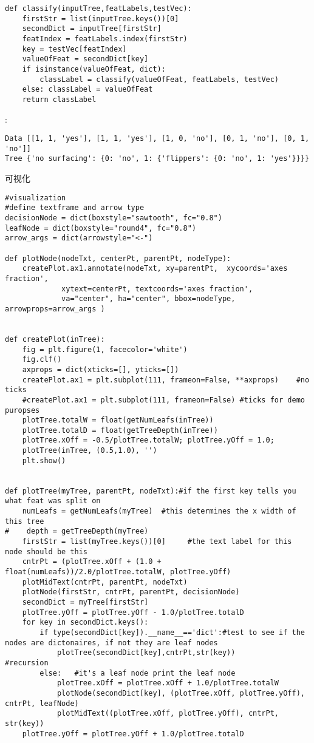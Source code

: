 \begin{lstlisting}
def classify(inputTree,featLabels,testVec):
    firstStr = list(inputTree.keys())[0]
    secondDict = inputTree[firstStr]
    featIndex = featLabels.index(firstStr)
    key = testVec[featIndex]
    valueOfFeat = secondDict[key]
    if isinstance(valueOfFeat, dict):
        classLabel = classify(valueOfFeat, featLabels, testVec)
    else: classLabel = valueOfFeat
    return classLabel
\end{lstlisting}
:
\begin{lstlisting}
Data [[1, 1, 'yes'], [1, 1, 'yes'], [1, 0, 'no'], [0, 1, 'no'], [0, 1, 'no']]
Tree {'no surfacing': {0: 'no', 1: {'flippers': {0: 'no', 1: 'yes'}}}}
\end{lstlisting}

\noindent 可视化
\begin{lstlisting}
#visualization
#define textframe and arrow type
decisionNode = dict(boxstyle="sawtooth", fc="0.8")
leafNode = dict(boxstyle="round4", fc="0.8")
arrow_args = dict(arrowstyle="<-")

def plotNode(nodeTxt, centerPt, parentPt, nodeType):
    createPlot.ax1.annotate(nodeTxt, xy=parentPt,  xycoords='axes fraction',
             xytext=centerPt, textcoords='axes fraction',
             va="center", ha="center", bbox=nodeType, arrowprops=arrow_args )


def createPlot(inTree):
    fig = plt.figure(1, facecolor='white')
    fig.clf()
    axprops = dict(xticks=[], yticks=[])
    createPlot.ax1 = plt.subplot(111, frameon=False, **axprops)    #no ticks
    #createPlot.ax1 = plt.subplot(111, frameon=False) #ticks for demo puropses
    plotTree.totalW = float(getNumLeafs(inTree))
    plotTree.totalD = float(getTreeDepth(inTree))
    plotTree.xOff = -0.5/plotTree.totalW; plotTree.yOff = 1.0;
    plotTree(inTree, (0.5,1.0), '')
    plt.show()


def plotTree(myTree, parentPt, nodeTxt):#if the first key tells you what feat was split on
    numLeafs = getNumLeafs(myTree)  #this determines the x width of this tree
#    depth = getTreeDepth(myTree)
    firstStr = list(myTree.keys())[0]     #the text label for this node should be this
    cntrPt = (plotTree.xOff + (1.0 + float(numLeafs))/2.0/plotTree.totalW, plotTree.yOff)
    plotMidText(cntrPt, parentPt, nodeTxt)
    plotNode(firstStr, cntrPt, parentPt, decisionNode)
    secondDict = myTree[firstStr]
    plotTree.yOff = plotTree.yOff - 1.0/plotTree.totalD
    for key in secondDict.keys():
        if type(secondDict[key]).__name__=='dict':#test to see if the nodes are dictonaires, if not they are leaf nodes
            plotTree(secondDict[key],cntrPt,str(key))        #recursion
        else:   #it's a leaf node print the leaf node
            plotTree.xOff = plotTree.xOff + 1.0/plotTree.totalW
            plotNode(secondDict[key], (plotTree.xOff, plotTree.yOff), cntrPt, leafNode)
            plotMidText((plotTree.xOff, plotTree.yOff), cntrPt, str(key))
    plotTree.yOff = plotTree.yOff + 1.0/plotTree.totalD



\end{lstlisting}
